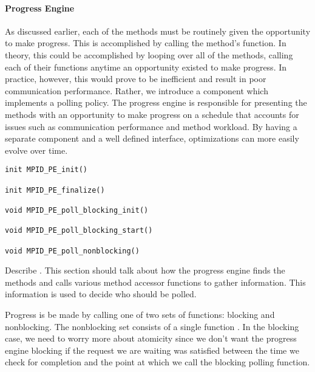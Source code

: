 
\paragraph{Progress Engine}


As discussed earlier, each of the methods must be routinely given the
opportunity to make progress.  This is accomplished by calling the method's
 function.  In theory, this could be accomplished by looping over
all of the methods, calling each of their  functions anytime an
opportunity existed to make progress.  In practice, however, this would prove
to be inefficient and result in poor communication performance.  Rather, we
introduce a  component which implements a polling policy.
The progress engine is responsible for presenting the methods with an
opportunity to make progress on a schedule that accounts for issues such as
communication performance and method workload.  By having a separate component
and a well defined interface, optimizations can more easily evolve over time.

\begin{verbatim}
init MPID_PE_init()

init MPID_PE_finalize()

void MPID_PE_poll_blocking_init()

void MPID_PE_poll_blocking_start()

void MPID_PE_poll_nonblocking()
\end{verbatim}

\todo Describe .  This section should talk about how the
progress engine finds the methods and calls various method accessor functions
to gather information.  This information is used to decide who should be
polled.

Progress is be made by calling one of two sets of functions: blocking and
nonblocking.  The nonblocking set consists of a single function
.  In the blocking case, we need to worry more
about atomicity since we don't want the progress engine blocking if the
request we are waiting was satisfied between the time we check for completion
and the point at which we call the
blocking polling function.  

